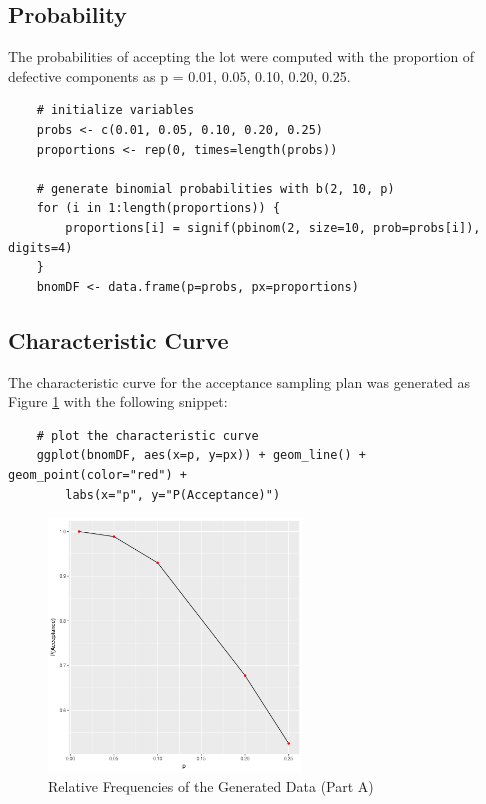 \documentclass{article}
\begin{document}
        \subsection{Probability}
            The probabilities of accepting the lot were computed with the proportion of defective components as p = 0.01, 0.05, 0.10, 0.20, 0.25.

\begin{lstlisting}
    # initialize variables
    probs <- c(0.01, 0.05, 0.10, 0.20, 0.25)
    proportions <- rep(0, times=length(probs))

    # generate binomial probabilities with b(2, 10, p)
    for (i in 1:length(proportions)) {
        proportions[i] = signif(pbinom(2, size=10, prob=probs[i]), digits=4)
    }
    bnomDF <- data.frame(p=probs, px=proportions)
\end{lstlisting}


        \subsection{Characteristic Curve}
            The characteristic curve for the acceptance sampling plan was generated as Figure \ref{fig:charcurve1} with the following snippet:

\begin{lstlisting}
    # plot the characteristic curve
    ggplot(bnomDF, aes(x=p, y=px)) + geom_line() + geom_point(color="red") +
        labs(x="p", y="P(Acceptance)")
\end{lstlisting}

            \begin{figure}[h]
                \begin{center}
                    \includegraphics[width=0.6\textwidth]{figures/charcurve1.png}
                    \caption{Relative Frequencies of the Generated Data (Part A)} \label{fig:charcurve1}
                \end{center}
            \end{figure}
\end{document}
